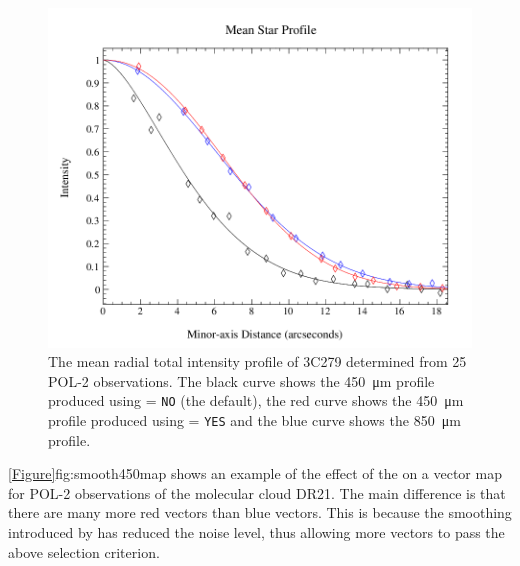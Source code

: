 \begin{figure}[ht!]
\begin{center}
\includegraphics[width=0.9\linewidth]{sc22-smooth450-psf-1.png}
\caption [PSF plot showing the effect of the \poltwomap\  parameter.]{
  The mean radial total intensity profile of 3C279 determined from 25 POL-2 observations. The black curve shows the \SI{450}{\micro\metre} profile produced using  = \texttt{NO} (the default), the red curve shows the \SI{450}{\micro\metre} profile produced using  = \texttt{YES} and the blue curve shows the \SI{850}{\micro\metre} profile.
\label{fig:smooth450psf}
}
\end{center}
\end{figure}

\cref{Figure}{fig:smooth450map}{} shows an example of the effect of the  on a vector map for POL-2 observations of the molecular cloud DR21. The main difference is that there are many more red vectors than blue vectors. This is because the smoothing introduced by  has reduced the noise level, thus allowing more vectors to pass the above selection criterion.


